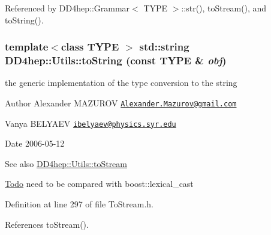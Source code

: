 Referenced by DD4hep::Grammar$<$ TYPE $>$::str(), toStream(), and toString().\hypertarget{namespace_d_d4hep_1_1_utils_a30628e1cc5d4a214cc8a33f99b38d466}{
\subsubsection[{toString}]{\setlength{\rightskip}{0pt plus 5cm}template$<$class TYPE $>$ std::string DD4hep::Utils::toString (const TYPE \& {\em obj})}}
\label{namespace_d_d4hep_1_1_utils_a30628e1cc5d4a214cc8a33f99b38d466}
the generic implementation of the type conversion to the string \begin{DoxyAuthor}{Author}
Alexander MAZUROV \href{mailto:Alexander.Mazurov@gmail.com}{\tt Alexander.Mazurov@gmail.com} 

Vanya BELYAEV \href{mailto:ibelyaev@physics.syr.edu}{\tt ibelyaev@physics.syr.edu} 
\end{DoxyAuthor}
\begin{DoxyDate}{Date}
2006-\/05-\/12 
\end{DoxyDate}
\begin{DoxySeeAlso}{See also}
\hyperlink{namespace_d_d4hep_1_1_utils_ab016d8d624f13c9f5470910f2057b860}{DD4hep::Utils::toStream} 
\end{DoxySeeAlso}
\begin{Desc}
\item[\hyperlink{todo__todo000002}{Todo}]need to be compared with boost::lexical\_\-cast \end{Desc}


Definition at line 297 of file ToStream.h.

References toStream().